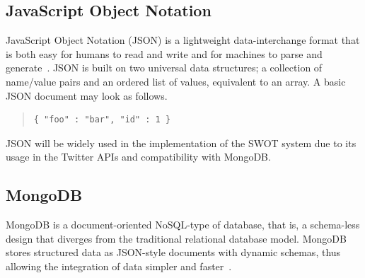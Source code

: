 \subsection{JavaScript Object Notation}
JavaScript Object Notation (JSON) is a lightweight data-interchange format that is both easy for humans to read and write and for machines to parse and generate~\cite{json}. JSON is built on two universal data structures; a collection of name/value pairs and an ordered list of values, equivalent to an array. A basic JSON document may look as follows.

\begin{quote}
\begin{verbatim}
{ "foo" : "bar", "id" : 1 }
\end{verbatim}
\end{quote}

JSON will be widely used in the implementation of the SWOT system due to its usage in the Twitter APIs and compatibility with MongoDB. 

\subsection{MongoDB}
MongoDB is a document-oriented NoSQL-type of database, that is, a schema-less design that diverges from the traditional relational database model. MongoDB stores structured data as JSON-style documents with dynamic schemas, thus allowing the integration of data simpler and faster~\cite{mongodb}.

